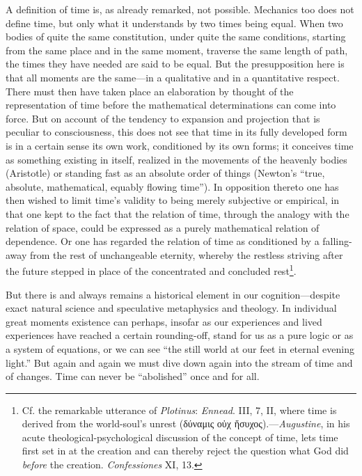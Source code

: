 \documentclass[12pt,a4paper]{book}
\newcommand{\opage}[1]{\marginnote{\footnotesize\textit{[#1]}}}
\begin{document}
A definition of time is, as already remarked, not possible. Mechanics too
does not define time, but only what it understands by two times being equal.
When two bodies of quite the same constitution, under quite the same
conditions, starting from the same place and in the same moment, traverse the
same length of path, the times they have needed are said to be equal. But the
presupposition here is that all moments are the same---in a qualitative and
in a quantitative respect. There must then have taken place an \opage{189}elaboration by
thought of the representation of time before the mathematical determinations
can come into force. But on account of the tendency to expansion and
projection that is peculiar to consciousness, this does not see that time in
its fully developed form is in a certain sense its own work, conditioned by
its own forms; it conceives time as something existing in itself, realized in
the movements of the heavenly bodies (Aristotle) or standing fast as an
absolute order of things (Newton's ``true, absolute, mathematical, equably
flowing time''). In opposition thereto one has then wished to limit time's
validity to being merely subjective or empirical, in that one kept to the
fact that the relation of time, through the analogy with the relation of
space, could be expressed as a purely mathematical relation of dependence.
Or one has regarded the relation of time as conditioned by a falling-away
from the rest of unchangeable eternity, whereby the restless striving after
the future stepped in place of the concentrated and concluded
rest\footnote{Cf. the remarkable utterance of \emph{Plotinus}: \emph{Ennead}.
III, 7, II, where time is derived from the world-soul's unrest (δύναμις οὐχ
ἥσυχος).---\emph{Augustine}, in his acute theological-psychological
discussion of the concept of time, lets time first set in at the creation and
can thereby reject the question what God did \emph{before} the creation.
\emph{Confessiones} XI, 13.}.

But there is and always remains a historical element in our cognition---despite
exact natural science and speculative metaphysics and theology. In individual
great moments existence can perhaps, insofar as our experiences and lived
experiences have reached a certain rounding-off, stand for us as a pure logic or
as a system of equations, or we can see ``the still world at our feet in
eternal evening light.'' But again and again we must dive down again into the
stream of time and of changes. Time can never be ``abolished'' once and for
all.
\end{document}
